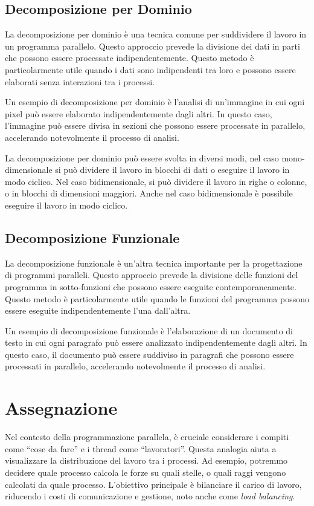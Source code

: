 \subsection{Decomposizione per Dominio}
La decomposizione per dominio è una tecnica
comune per suddividere il lavoro in un programma
parallelo. Questo approccio prevede la divisione
dei dati in parti che possono essere processate
indipendentemente. Questo metodo è particolarmente
utile quando i dati sono indipendenti tra loro
e possono essere elaborati senza interazioni
tra i processi.

Un esempio di decomposizione per dominio è
l'analisi di un'immagine in cui ogni pixel
può essere elaborato indipendentemente dagli
altri. In questo caso, l'immagine può essere
divisa in sezioni che possono essere processate
in parallelo, accelerando notevolmente il
processo di analisi.

La decomposizione per dominio può essere
svolta in diversi modi, nel caso mono-dimensionale
si può dividere il lavoro in blocchi di dati
o eseguire il lavoro in modo ciclico.
Nel caso bidimensionale, si può dividere il
lavoro in righe o colonne, o in blocchi di
dimensioni maggiori. Anche nel caso bidimensionale
è possibile eseguire il lavoro in modo ciclico.

\subsection{Decomposizione Funzionale}
La decomposizione funzionale è un'altra tecnica
importante per la progettazione di programmi
paralleli. Questo approccio prevede la divisione
delle funzioni del programma in sotto-funzioni
che possono essere eseguite contemporaneamente.
Questo metodo è particolarmente utile quando
le funzioni del programma possono essere
eseguite indipendentemente l'una dall'altra.

Un esempio di decomposizione funzionale è
l'elaborazione di un documento di testo in cui
ogni paragrafo può essere analizzato
indipendentemente dagli altri. In questo caso,
il documento può essere suddiviso in paragrafi
che possono essere processati in parallelo,
accelerando notevolmente il processo di analisi.

\section{Assegnazione}
Nel contesto della programmazione parallela, è cruciale
considerare i compiti come ``cose da fare'' e i thread
come ``lavoratori''. Questa analogia aiuta a visualizzare
la distribuzione del lavoro tra i processi. Ad esempio,
potremmo decidere quale processo calcola le forze su quali
stelle, o quali raggi vengono calcolati da quale processo.
L'obiettivo principale è bilanciare il carico di lavoro,
riducendo i costi di comunicazione e gestione, noto anche
come \textit{load balancing}.

